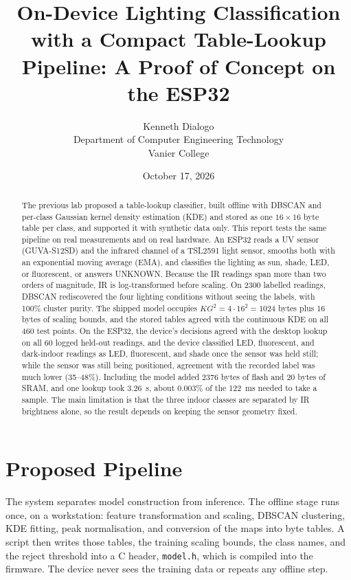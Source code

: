 \documentclass[10pt,a4paper,twocolumn]{article}
\title{On-Device Lighting Classification with a Compact Table-Lookup Pipeline: A Proof of Concept on the ESP32}
\author{Kenneth Dialogo \\ Department of Computer Engineering Technology \\ Vanier College}
\date{October 17, 2026}
\begin{document}
\maketitle

\begin{abstract}
The previous lab proposed a table-lookup classifier, built offline with DBSCAN and per-class Gaussian kernel density estimation (KDE) and stored as one $16\times16$ byte table per class, and supported it with synthetic data only. This report tests the same pipeline on real measurements and on real hardware. An ESP32 reads a UV sensor (GUVA-S12SD) and the infrared channel of a TSL2591 light sensor, smooths both with an exponential moving average (EMA), and classifies the lighting as sun, shade, LED, or fluorescent, or answers UNKNOWN. Because the IR readings span more than two orders of magnitude, IR is log-transformed before scaling. On 2300 labelled readings, DBSCAN rediscovered the four lighting conditions without seeing the labels, with 100\% cluster purity. The shipped model occupies $K G^2 = 4\cdot16^2 = 1024$ bytes plus 16 bytes of scaling bounds, and the stored tables agreed with the continuous KDE on all 460 test points. On the ESP32, the device's decisions agreed with the desktop lookup on all 60 logged held-out readings, and the device classified LED, fluorescent, and dark-indoor readings as LED, fluorescent, and shade once the sensor was held still; while the sensor was still being positioned, agreement with the recorded label was much lower (35--48\%). Including the model added 2376 bytes of flash and 20 bytes of SRAM, and one lookup took 3.26~\textmu s, about 0.003\% of the 122~ms needed to take a sample. The main limitation is that the three indoor classes are separated by IR brightness alone, so the result depends on keeping the sensor geometry fixed.
\end{abstract}

\section{Proposed Pipeline}

The system separates model construction from inference. The offline stage runs once, on a workstation: feature transformation and scaling, DBSCAN clustering, KDE fitting, peak normalisation, and conversion of the maps into byte tables. A script then writes those tables, the training scaling bounds, the class names, and the reject threshold into a C header, \texttt{model.h}, which is compiled into the firmware. The device never sees the training data or repeats any offline step.
\end{document}
